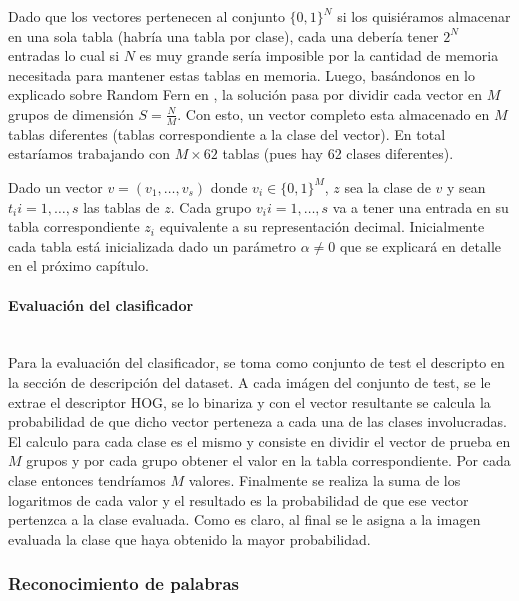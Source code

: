 			Dado que los vectores pertenecen al conjunto $\{ 0,1 \}^{N}$ si los quisiéramos almacenar en una sola tabla (habría una tabla por clase), cada una debería tener $2^{N}$ entradas lo cual si $N$ es muy grande sería imposible por la cantidad de memoria necesitada para mantener estas tablas en memoria. Luego, basándonos en lo explicado sobre Random Fern en \cite{subsection:ferns}, la solución pasa por dividir cada vector en $M$ grupos de dimensión $S = \frac{N}{M}$. Con esto, un vector completo esta almacenado en $M$ tablas diferentes (tablas correspondiente a la clase del vector). En total estaríamos trabajando con $M \times 62$ tablas (pues hay 62 clases diferentes).

			Dado un vector $v=(v_1, \dots, v_s)$ donde $v_i \in \{ 0,1 \}^{M}$, $z$ sea la clase de $v$ y sean $t_i i=1, \dots, s$ las tablas de $z$. Cada grupo $v_i i=1, \dots, s$ va a tener una entrada en su tabla correspondiente $z_i$ equivalente a su representación decimal. Inicialmente cada tabla está inicializada dado un parámetro $\alpha \neq 0$ que se explicará en detalle en el próximo capítulo.

		\paragraph{Evaluación del clasificador} ~\\

			Para la evaluación del clasificador, se toma como conjunto de test el descripto en la sección de descripción del dataset. A cada imágen del conjunto de test, se le extrae el descriptor HOG, se lo binariza y con el vector resultante se calcula la probabilidad de que dicho vector perteneza a cada una de las clases involucradas. El calculo para cada clase es el mismo y consiste en dividir el vector de prueba en $M$ grupos y por cada grupo obtener el valor en la tabla correspondiente. Por cada clase entonces tendríamos $M$ valores. Finalmente se realiza la suma de los logaritmos de cada valor y el resultado es la probabilidad de que ese vector pertenzca a la clase evaluada. Como es claro, al final se le asigna a la imagen evaluada la clase que haya obtenido la mayor probabilidad.

	\subsubsection{Reconocimiento de palabras}

